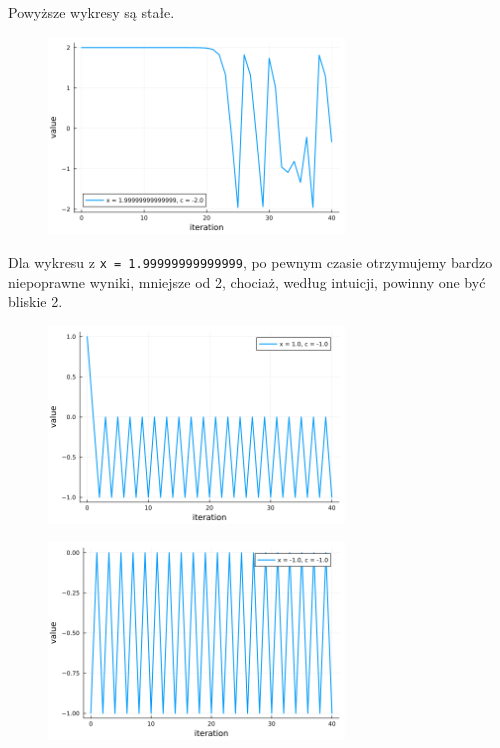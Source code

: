 \documentclass[15pt, a4paper]{article}
\begin{document}
\vspace{0.5cm}

\noindent Powyższe wykresy są stałe.

\vspace{0.5cm}

\pagebreak

\begin{figure}[h]
    \centering
    \includegraphics[width=0.7\textwidth]{img/6_3_plot.png}
\end{figure}

\vspace{0.5cm}

\noindent Dla wykresu z \verb|x = 1.99999999999999|, po pewnym czasie otrzymujemy bardzo niepoprawne wyniki, mniejsze od 2, chociaż, według intuicji, powinny one być bliskie 2.

\vspace{0.5cm}

\pagebreak

\begin{figure}[h]
    \centering
    \includegraphics[width=0.7\textwidth]{img/6_4_plot.png}
\end{figure}

\begin{figure}[h]
    \centering
    \includegraphics[width=0.7\textwidth]{img/6_5_plot.png}
\end{figure}
\end{document}
